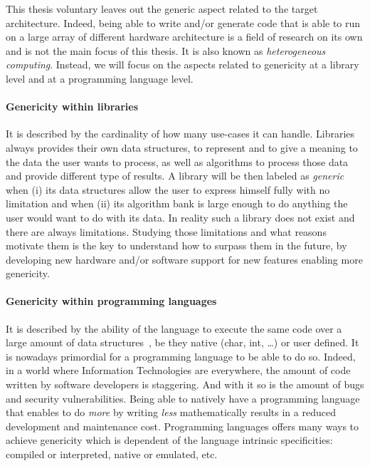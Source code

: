 This thesis voluntary leaves out the generic aspect related to the target architecture. Indeed, being able to write
and/or generate code that is able to run on a large array of different hardware architecture is a field of research on
its own and is not the main focus of this thesis. It is also known as \emph{heterogeneous computing}. Instead, we will
focus on the aspects related to genericity at a library level and at a programming language level.

\paragraph{Genericity within libraries} It is described by the cardinality of how many use-cases it can handle.
Libraries always provides their own data structures, to represent and to give a meaning to the data the user wants to
process, as well as algorithms to process those data and provide different type of results. A library will be then
labeled as \emph{generic}~\parencite{musser.1994.algorithm} when (i) its data structures allow the user to express
himself fully with no limitation and when (ii) its algorithm bank is large enough to do anything the user would want to
do with its data. In reality such a library does not exist and there are always limitations. Studying those limitations
and what reasons motivate them is the key to understand how to surpass them in the future, by developing new hardware
and/or software support for new features enabling more genericity.

\paragraph{Genericity within programming languages} It is described by the ability of the language to execute the same
code over a large amount of data structures~\parencite{dehnert.1998.fundamentals}, be they native (char, int, \ldots) or
user defined. It is nowadays primordial for a programming language to be able to do so. Indeed, in a world where
Information Technologies are everywhere, the amount of code written by software developers is staggering. And with it so
is the amount of bugs and security vulnerabilities. Being able to natively have a programming language that enables to
do \emph{more} by writing \emph{less} mathematically results in a reduced development and maintenance cost. Programming
languages offers many ways to achieve genericity which is dependent of the language intrinsic specificities: compiled or
interpreted, native or emulated, etc.


